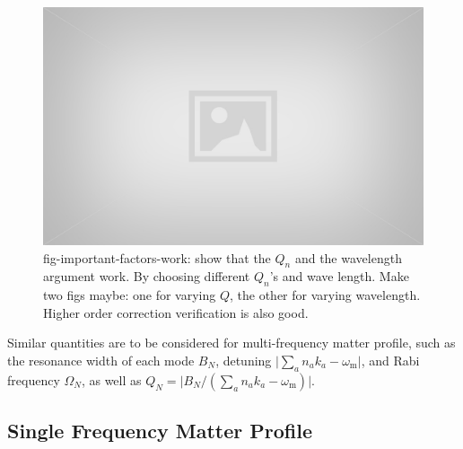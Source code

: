 \documentclass[%
reprint,
 amsmath,amssymb,
 aps,
]{revtex4-1}
\begin{document}
\begin{figure}[!htbp]
                \centering
                \includegraphics[width=\columnwidth]{assets/placeholder.jpg}%
                \caption{fig-important-factors-work: show that the $Q_n$ and the wavelength argument work. By choosing different $Q_n$'s and wave length. Make two figs maybe: one for varying $Q$, the other for varying wavelength. Higher order correction verification is also good.}
                \label{fig-important-factors-work}
\end{figure}




Similar quantities are to be considered for multi-frequency matter profile, such as the resonance width of each mode $B_N$, detuning $\lvert \sum_a n_a k_a - \omega_{\mathrm{m}} \rvert$, and Rabi frequency $\Omega_N$, as well as $Q_N =\lvert B_N/( \sum_a n_a k_a - \omega_{\mathrm{m}}  )\rvert$. 




\subsection{Single Frequency Matter Profile}
\end{document}
